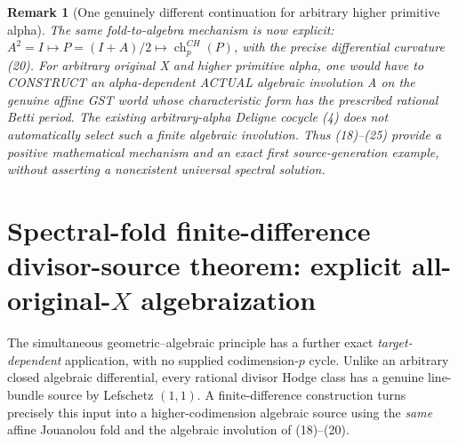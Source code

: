 \documentclass[11pt]{article}
\newtheorem{remark}[theorem]{Remark}
\begin{document}
\begin{remark}[One genuinely different continuation for arbitrary higher primitive alpha]
The same fold-to-algebra mechanism
is now explicit:
$A^2=I\mapsto P=(I+A)/2
\mapsto \operatorname{ch}^{CH}_p(P)$,
with the precise differential
curvature (20).
For arbitrary original X
and higher primitive alpha,
one would have to CONSTRUCT
an alpha-dependent ACTUAL
algebraic involution A
on the genuine affine GST
world whose characteristic
form has the prescribed
rational Betti period.
The existing arbitrary-alpha
Deligne cocycle (4)
does not automatically
select such a finite
algebraic involution.
Thus (18)--(25)
provide a positive
mathematical mechanism
and an exact first
source-generation example,
without asserting
a nonexistent
universal spectral
solution.
\end{remark}


\section{Spectral-fold finite-difference divisor-source theorem: explicit all-original-$X$ algebraization}
The simultaneous geometric--algebraic principle has a further exact
\emph{target-dependent} application, with no supplied codimension-$p$
cycle. Unlike an arbitrary closed algebraic differential, every rational
divisor Hodge class has a genuine line-bundle source by Lefschetz $(1,1)$.
A finite-difference construction turns precisely this input into
a higher-codimension algebraic source using the \emph{same} affine
Jouanolou fold and the algebraic involution of (18)--(20).
\end{document}
